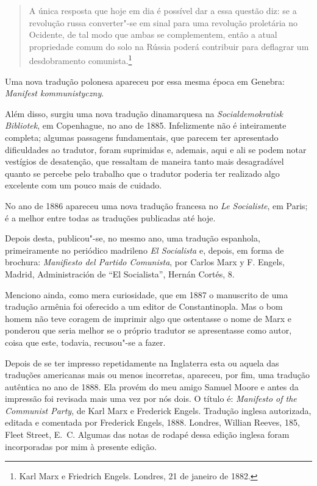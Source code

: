 \begin{quote}
 A única resposta que hoje em dia é possível dar a essa questão diz: se
a revolução russa converter"-se em sinal para uma revolução proletária
no Ocidente, de tal modo que ambas se complementem, então a atual
propriedade comum do solo na Rússia poderá contribuir para deflagrar um
desdobramento comunista.\footnote{Karl Marx e Friedrich Engels. Londres, 21 de janeiro de 1882.}
\end{quote} 

 Uma nova tradução polonesa apareceu por essa mesma época em Genebra:
\textit{Manifest kommunistyczny}.

 Além disso, surgiu uma nova tradução dinamarquesa na
\textit{Socialdemokratisk Bibliotek}, em Copenhague, no ano de 1885.
Infelizmente não é inteiramente completa; algumas passagens
fundamentais, que parecem ter apresentado dificuldades ao tradutor,
foram suprimidas e, ademais, aqui e ali se podem notar vestígios de
desatenção, que ressaltam de maneira tanto mais desagradável quanto se
percebe pelo trabalho que o tradutor poderia ter realizado algo
excelente com um pouco mais de cuidado.

 No ano de 1886 apareceu uma nova tradução francesa no \textit{Le
Socialiste}, em Paris; é a melhor entre todas as traduções publicadas
até hoje.

 Depois desta, publicou"-se, no mesmo ano, uma tradução espanhola,
primeiramente no periódico madrileno \textit{El Socialista} e, depois,
em forma de brochura: \textit{Manifiesto del Partido Comunista}, por
Carlos Marx y F. Engels, Madrid, Administración de “El Socialista”,
Hernán Cortés, 8.

 Menciono ainda, como mera curiosidade, que em 1887 o manuscrito de uma
tradução armênia foi oferecido a um editor de Constantinopla. Mas o bom
homem não teve coragem de imprimir algo que ostentasse o nome de Marx e
ponderou que seria melhor se o próprio tradutor se apresentasse como
autor, coisa que este, todavia, recusou"-se a fazer.

 Depois de se ter impresso\textbf{} repetidamente na Inglaterra esta ou
aquela das traduções americanas mais ou menos incorretas, apareceu, por
fim, uma tradução autêntica no ano de 1888. Ela provém do meu amigo
Samuel Moore e antes da impressão foi revisada mais uma vez por nós
dois. O título é: \textit{Manifesto of the Communist Party}, de Karl
Marx e Frederick Engels. Tradução inglesa autorizada, editada e comentada por Frederick Engels, 1888. Londres, Willian Reeves, 185, Fleet Street, E.~C. Algumas das notas de rodapé dessa edição inglesa foram
incorporadas por mim à presente edição.

